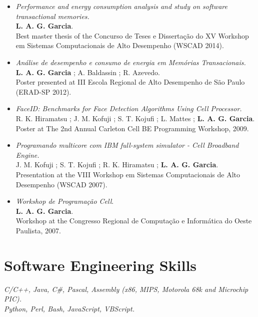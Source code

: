 \documentclass[10pt]{article} %
\begin{document}
\begin{itemize}
 \item \textit{Performance and energy consumption analysis and study on software transactional memories.} \\
  \textbf{L. A. G. Garcia}. \\
  Best master thesis of the Concurso de Teses e Dissertação do XV Workshop em Sistemas Computacionais de Alto Desempenho (WSCAD 2014).
 \item \textit{Análise de desempenho e consumo de energia em Memórias Transacionais.} \\
  \textbf{L. A. G. Garcia} ; A. Baldassin ; R. Azevedo. \\
  Poster presented at III Escola Regional de Alto Desempenho de São Paulo (ERAD-SP 2012).
 \item \textit{FaceID: Benchmarks for Face Detection Algorithms Using Cell Processor.} \\
  R. K. Hiramatsu ; J. M. Kofuji ; S. T. Kojufi ; L. Mattes ; \textbf{L. A. G. Garcia}. \\
  Poster at The 2nd Annual Carleton Cell BE Programming Workshop, 2009.
 \item \textit{Programando multicore com IBM full-system simulator - Cell Broadband Engine.} \\
  J. M. Kofuji ; S. T. Kojufi ; R. K. Hiramatsu ; \textbf{L. A. G. Garcia}. \\
  Presentation at the VIII Workshop em Sistemas Computacionais de Alto Desempenho (WSCAD 2007).
 \item \textit{Workshop de Programação Cell}. \\
  \textbf{L. A. G. Garcia}. \\
  Workshop at the Congresso Regional de Computação e Informática do Oeste Paulista, 2007.
\end{itemize}


\section{Software Engineering Skills}

{
\textit{C/C++, Java, C\#, Pascal, Assembly (x86, MIPS, Motorola 68k and Microchip PIC).} \\
\textit{Python, Perl, Bash, JavaScript, VBScript.} \\
}
\end{document}
